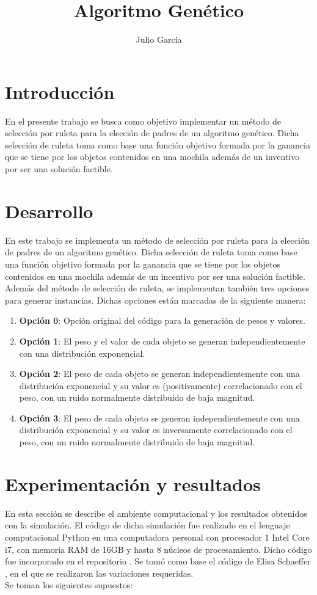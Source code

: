 \documentclass{article}
\title {Algoritmo Genético}
\author{Julio Garc\'ia}
\begin{document}
	\renewcommand{\listtablename}{Índice de tablas}
	\renewcommand{\tablename}{Cuadro}
	\maketitle
	
	\section{Introducción}
	En el presente trabajo se busca como objetivo implementar un método de selección por ruleta para la elección de padres de un algoritmo genético. Dicha selección de ruleta toma como base una función objetivo formada por la ganancia que se tiene por los objetos contenidos en una mochila además de un inventivo por ser una solución factible. 
	
	\section{Desarrollo}
	En este trabajo se implementa un método de selección por ruleta para la elección de padres de un algoritmo genético. Dicha selección de ruleta toma como base una función objetivo formada por la ganancia que se tiene por los objetos contenidos en una mochila además de un incentivo por ser una solución factible.\\
	Además del método de selección de ruleta, se implementan también tres opciones para generar instancias. Dichas opciones están marcadas de la siguiente manera:
	\begin{enumerate}
	\item	\textbf {Opción 0}: Opción original del código para la generación de pesos y valores.
	\item 	\textbf{Opción 1}: El peso y el valor de cada objeto se generan independientemente con una distribución exponencial.
	\item   \textbf{Opción 2}:  El peso de cada objeto se generan independientemente con una distribución exponencial y su valor es (positivamente) correlacionado con el peso, con un ruido normalmente distribuido de baja magnitud.
	\item   \textbf{Opción 3}: El peso de cada objeto se generan independientemente con una distribución exponencial y su valor es inversamente correlacionado con el peso, con un ruido normalmente distribuido de baja magnitud.
	\end{enumerate}

	\section{Experimentación y resultados}
	En esta sección se describe el ambiente computacional y los resultados obtenidos con la simulación. El código de dicha simulación fue realizado en el lenguaje computacional Python en una computadora personal con procesador 1 Intel Core i7, con memoria RAM de 16GB y hasta 8 núcleos de procesamiento. Dicho código fue incorporado en el repositorio \cite{p_a}.  Se tomó como base el código de Elisa Schaeffer \cite{pa}, en el que se realizaron las variaciones requeridas.\\
	Se toman los siguientes supuestos:
\end{document}
